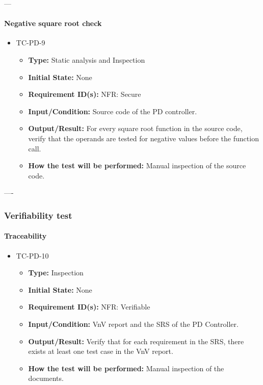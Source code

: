 \documentclass[12pt, titlepage]{article}
\begin{document}
---

\paragraph{Negative square root check}
\begin{itemize}
\item{TC-PD-9\\}
\begin{itemize}
\item{\textbf{Type:}} Static analysis and Inspection
					
\item{\textbf{Initial State:}} None

\item{\textbf{Requirement ID(s):}}  NFR: Secure
					
\item{\textbf{Input/Condition:}}  Source code of the PD controller.
					
\item{\textbf{Output/Result:}} For every square root function in the source code,
verify that the operands are tested for negative values before the function call.

\item{\textbf{How the test will be performed:}}  Manual inspection of the source code.
\end{itemize}
\end{itemize}

----

\subsubsection{Verifiability test}

\paragraph{Traceability}

\begin{itemize}
\item{TC-PD-10\\}
\begin{itemize}
\item{\textbf{Type:}} Inspection
					
\item{\textbf{Initial State:}} None

\item{\textbf{Requirement ID(s):}} NFR: Verifiable
					
\item{\textbf{Input/Condition:}} VnV report and the SRS of the PD Controller.
					
\item{\textbf{Output/Result:}} Verify that for each requirement in the SRS, there
exists at least one test case in the VnV report.
 
\item{\textbf{How the test will be performed:}} Manual inspection of the documents.
\end{itemize}
\end{itemize}
\end{document}
